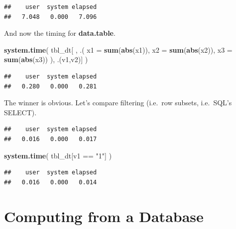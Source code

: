 \documentclass[]{book}
\newenvironment{Shaded}{\begin{snugshade}}{\end{snugshade}}
\newcommand{\KeywordTok}[1]{\textcolor[rgb]{0.13,0.29,0.53}{\textbf{{#1}}}}
\newcommand{\DataTypeTok}[1]{\textcolor[rgb]{0.13,0.29,0.53}{{#1}}}
\newcommand{\StringTok}[1]{\textcolor[rgb]{0.31,0.60,0.02}{{#1}}}
\newcommand{\NormalTok}[1]{{#1}}
\theoremstyle{definition}
\theoremstyle{definition}
\theoremstyle{remark}
\begin{document}
\begin{verbatim}
##    user  system elapsed 
##   7.048   0.000   7.096
\end{verbatim}

And now the timing for \textbf{data.table}.

\begin{Shaded}
\begin{Highlighting}[]
\KeywordTok{system.time}\NormalTok{( }
  \NormalTok{tbl_dt[ ,  .( }\DataTypeTok{x1 =} \KeywordTok{sum}\NormalTok{(}\KeywordTok{abs}\NormalTok{(x1)), }\DataTypeTok{x2 =} \KeywordTok{sum}\NormalTok{(}\KeywordTok{abs}\NormalTok{(x2)), }\DataTypeTok{x3 =} \KeywordTok{sum}\NormalTok{(}\KeywordTok{abs}\NormalTok{(x3)) ), .(v1,v2)]}
  \NormalTok{)}
\end{Highlighting}
\end{Shaded}

\begin{verbatim}
##    user  system elapsed 
##   0.280   0.000   0.281
\end{verbatim}

The winner is obvious. Let's compare filtering (i.e.~row subsets,
i.e.~SQL's SELECT).

\begin{Shaded}
\end{Shaded}

\begin{verbatim}
##    user  system elapsed 
##   0.016   0.000   0.017
\end{verbatim}

\begin{Shaded}
\begin{Highlighting}[]
\KeywordTok{system.time}\NormalTok{( }
  \NormalTok{tbl_dt[v1 ==}\StringTok{ "1"}\NormalTok{] }
  \NormalTok{)}
\end{Highlighting}
\end{Shaded}

\begin{verbatim}
##    user  system elapsed 
##   0.016   0.000   0.014
\end{verbatim}

\section{Computing from a Database}\label{computing-from-a-database}
\end{document}
